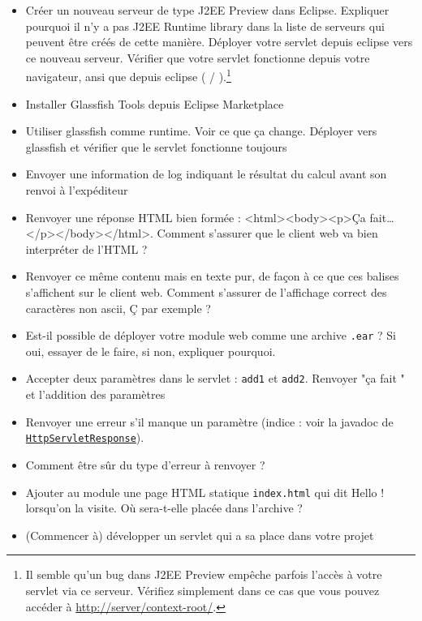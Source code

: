 \documentclass[english, french]{beamer}
\begin{document}
\begin{frame}[allowframebreaks]
\begin{itemize}
		\item Créer un nouveau serveur de type J2EE Preview dans Eclipse. Expliquer pourquoi il n’y a pas \og{}J2EE Runtime library\fg{} dans la liste de serveurs qui peuvent être créés de cette manière. Déployer votre servlet depuis eclipse vers ce nouveau serveur. Vérifier que votre servlet fonctionne depuis votre navigateur, ansi que depuis eclipse ( / ).\footnote{Il semble qu’un bug dans J2EE Preview empêche parfois l’accès à votre servlet via ce serveur. Vérifiez simplement dans ce cas que vous pouvez accéder à \url{http://server/context-root/}.}
		\item Installer Glassfish Tools depuis Eclipse Marketplace
		\item Utiliser glassfish comme runtime. Voir ce que ça change. Déployer vers glassfish et vérifier que le servlet fonctionne toujours
		\item Envoyer une information de log indiquant le résultat du calcul avant son renvoi à l’expéditeur
		\item Renvoyer une réponse HTML bien formée : <html><body><p>Ça fait…</p></body></html>. Comment s’assurer que le client web va bien interpréter de l’HTML ?
		\item Renvoyer ce même contenu mais en texte pur, de façon à ce que ces balises s’affichent sur le client web. Comment s’assurer de l’affichage correct des caractères non ascii, Ç par exemple ?
		\item[*\footnote{Les astérisques indiquent des exercices plus difficiles, à essayer de faire pour gagner des points de prestige.}] Est-il possible de déployer votre module web comme une archive \texttt{.ear} ? Si oui, essayer de le faire, si non, expliquer pourquoi.
		\item Accepter deux paramètres dans le servlet : \texttt{add1} et \texttt{add2}. Renvoyer "ça fait " et l’addition des paramètres
		\item Renvoyer une erreur s’il manque un paramètre (indice : voir la javadoc de \href{http://docs.oracle.com/javaee/7/api/javax/servlet/http/HttpServletResponse.html}{\texttt{HttpServletResponse}}).
		\item[*] Comment être sûr du type d’erreur à renvoyer ?
		\item Ajouter au module une page HTML statique \texttt{index.html} qui dit \og{}Hello !\fg{} lorsqu’on la visite. Où sera-t-elle placée dans l’archive ?
		\item (Commencer à) développer un servlet qui a sa place dans votre projet
	\end{itemize}
\end{frame}
\end{document}
